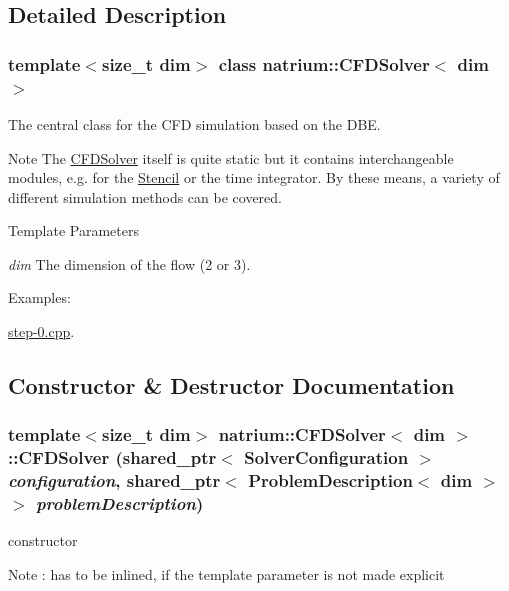\subsection{Detailed Description}
\subsubsection*{template$<$size\_\-t dim$>$ class natrium::CFDSolver$<$ dim $>$}

The central class for the CFD simulation based on the DBE. \begin{DoxyNote}{Note}
The \hyperlink{classnatrium_1_1CFDSolver}{CFDSolver} itself is quite static but it contains interchangeable modules, e.g. for the \hyperlink{classnatrium_1_1Stencil}{Stencil} or the time integrator. By these means, a variety of different simulation methods can be covered. 
\end{DoxyNote}

\begin{DoxyTemplParams}{Template Parameters}
\item[{\em dim}]The dimension of the flow (2 or 3). \end{DoxyTemplParams}
\begin{Desc}
\item[Examples: ]\par


\hyperlink{step-0_8cpp-example}{step-\/0.cpp}.\end{Desc}


\subsection{Constructor \& Destructor Documentation}
\hypertarget{classnatrium_1_1CFDSolver_a9d0e65b8a404ac3eaf80aee6c81945dc}{
\subsubsection[{CFDSolver}]{\setlength{\rightskip}{0pt plus 5cm}template$<$size\_\-t dim$>$ {\bf natrium::CFDSolver}$<$ dim $>$::{\bf CFDSolver} (shared\_\-ptr$<$ {\bf SolverConfiguration} $>$ {\em configuration}, \/  shared\_\-ptr$<$ {\bf ProblemDescription}$<$ dim $>$ $>$ {\em problemDescription})}}
\label{classnatrium_1_1CFDSolver_a9d0e65b8a404ac3eaf80aee6c81945dc}
constructor \begin{DoxyNote}{Note}
: has to be inlined, if the template parameter is not made explicit 
\end{DoxyNote}



